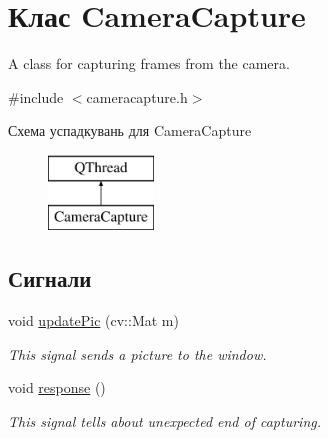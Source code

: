 \hypertarget{classCameraCapture}{\section{Клас Camera\-Capture}
\label{classCameraCapture}
}


A class for capturing frames from the camera.  




{\ttfamily \#include $<$cameracapture.\-h$>$}

Схема успадкувань для Camera\-Capture\begin{figure}[H]
\begin{center}
\leavevmode
\includegraphics[height=2.000000cm]{classCameraCapture}
\end{center}
\end{figure}
\subsection*{Сигнали}
\begin{DoxyCompactItemize}
\item 
\hypertarget{classCameraCapture_a4d5f58489a06c0f2dc17da937701849e}{void \hyperlink{classCameraCapture_a4d5f58489a06c0f2dc17da937701849e}{update\-Pic} (cv\-::\-Mat m)}\label{classCameraCapture_a4d5f58489a06c0f2dc17da937701849e}

\begin{DoxyCompactList}\small\item\em This signal sends a picture to the window. \end{DoxyCompactList}\item 
\hypertarget{classCameraCapture_a0626cba6e42bc84228d96fbb959fffe1}{void \hyperlink{classCameraCapture_a0626cba6e42bc84228d96fbb959fffe1}{response} ()}\label{classCameraCapture_a0626cba6e42bc84228d96fbb959fffe1}

\begin{DoxyCompactList}\small\item\em This signal tells about unexpected end of capturing. \end{DoxyCompactList}\end{DoxyCompactItemize}
